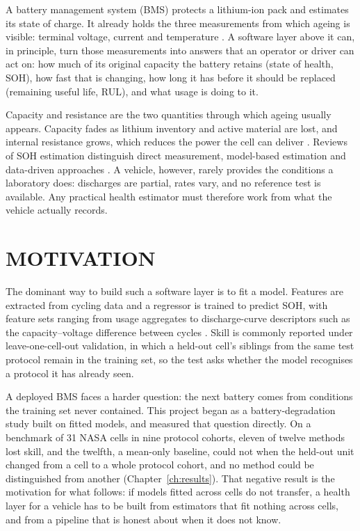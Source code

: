 \documentclass[12pt,a4paper]{amritareport}
\begin{document}
A battery management system (BMS) protects a lithium-ion pack and estimates its state of charge. It already holds the three measurements from which ageing is visible: terminal voltage, current and temperature \cite{waag2014}. A software layer above it can, in principle, turn those measurements into answers that an operator or driver can act on: how much of its original capacity the battery retains (state of health, SOH), how fast that is changing, how long it has before it should be replaced (remaining useful life, RUL), and what usage is doing to it.

Capacity and resistance are the two quantities through which ageing usually appears. Capacity fades as lithium inventory and active material are lost, and internal resistance grows, which reduces the power the cell can deliver \cite{vetter2005,barre2013}. Reviews of SOH estimation distinguish direct measurement, model-based estimation and data-driven approaches \cite{berecibar2016,waag2014}. A vehicle, however, rarely provides the conditions a laboratory does: discharges are partial, rates vary, and no reference test is available. Any practical health estimator must therefore work from what the vehicle actually records.

\section{MOTIVATION}

The dominant way to build such a software layer is to fit a model. Features are extracted from cycling data and a regressor is trained to predict SOH, with feature sets ranging from usage aggregates to discharge-curve descriptors such as the capacity--voltage difference between cycles \cite{severson2019}. Skill is commonly reported under leave-one-cell-out validation, in which a held-out cell's siblings from the same test protocol remain in the training set, so the test asks whether the model recognises a protocol it has already seen.

A deployed BMS faces a harder question: the next battery comes from conditions the training set never contained. This project began as a battery-degradation study built on fitted models, and measured that question directly. On a benchmark of 31 NASA cells in nine protocol cohorts, eleven of twelve methods lost skill, and the twelfth, a mean-only baseline, could not when the held-out unit changed from a cell to a whole protocol cohort, and no method could be distinguished from another (Chapter~\ref{ch:results}). That negative result is the motivation for what follows: if models fitted across cells do not transfer, a health layer for a vehicle has to be built from estimators that fit nothing across cells, and from a pipeline that is honest about when it does not know.
\end{document}
